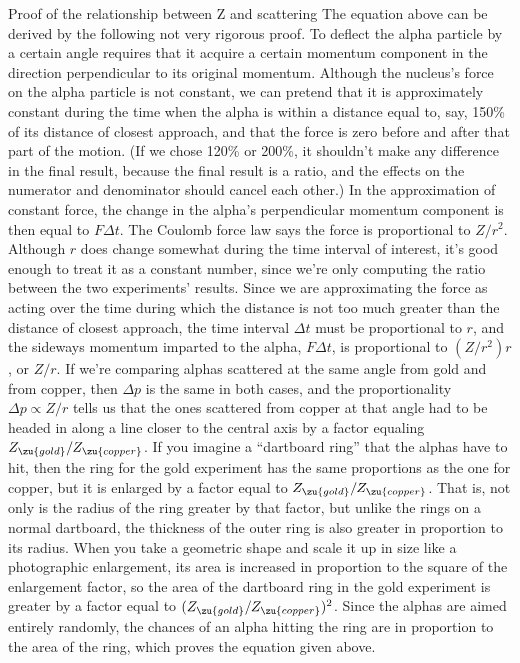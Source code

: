         \begin{eg}{Proof of the relationship between Z and scattering}\label{eg:zscatt}
        The equation above can be derived by the following not very rigorous
        proof. To deflect the alpha particle by a certain angle requires that
        it acquire a certain momentum component in the direction perpendicular
        to its original momentum. Although the nucleus's force on the alpha
        particle is not constant, we can pretend that it is approximately
        constant during the time when the alpha is within a distance equal to,
        say, 150\% of its distance of closest approach, and that the force is
        zero before and after that part of the motion. (If we chose 120\% or
        200\%, it shouldn't make any difference in the final result, because
        the final result is a ratio, and the effects on the numerator and
        denominator should cancel each other.) In the approximation of
        constant force, the change in the alpha's perpendicular momentum
        component is then equal to $F\Delta  t$. The Coulomb force law says the force
        is proportional to $Z/ r^2$. Although $r$ does change somewhat during the time
        interval of interest, it's good enough to treat it as a constant
        number, since we're only computing the ratio between the two
        experiments' results. Since we are approximating the force as acting
        over the time during which the distance is not too much greater than
        the distance of closest approach, the time interval $\Delta  t$ must be
        proportional to $r$, and the sideways momentum imparted to the alpha,
        $F\Delta  t$, is proportional to
         $( Z/ r^2) r$, or $Z/ r$. If we're comparing alphas
        scattered at the same angle from gold and from copper, then $\Delta  p$ is the
        same in both cases, and the proportionality 
        $\Delta  p\propto  Z/ r$  tells us that the ones
        scattered from copper at that angle had to be headed in along a line
        closer to the central axis by a factor equaling 
        $Z_\zu{gold}/ Z_\zu{copper}$. If you imagine a
        ``dartboard ring'' that the alphas have to hit, then the ring for the
        gold experiment has the same proportions as the one for copper, but it
        is enlarged by a factor equal to $Z_\zu{gold}/ Z_\zu{copper}$. 
        That is, not only is the radius of
        the ring greater by that factor, but unlike the rings on a normal
        dartboard, the thickness of the outer ring is also greater in
        proportion to its radius. When you take a geometric shape and scale it
        up in size like a photographic enlargement, its area is increased in
        proportion to the square of the enlargement factor, so the area of the
        dartboard ring in the gold experiment is greater by a factor equal to         
        $( Z_\zu{gold}/ Z_\zu{copper})^2$.
         Since the alphas are aimed entirely randomly, the chances of an
        alpha hitting the ring are in proportion to the area of the ring,
        which proves the equation given above.
        \end{eg}


